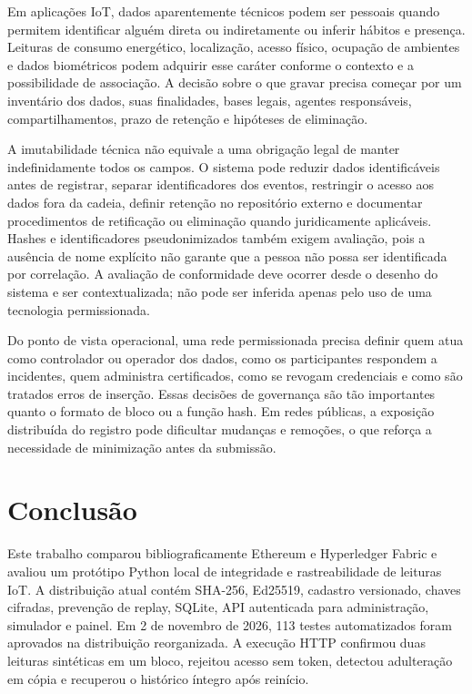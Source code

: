 \documentclass[10pt,a4paper,twocolumn]{article}
\begin{document}
Em aplicações IoT, dados aparentemente técnicos podem ser pessoais quando permitem identificar alguém direta ou indiretamente ou inferir hábitos e presença. Leituras de consumo energético, localização, acesso físico, ocupação de ambientes e dados biométricos podem adquirir esse caráter conforme o contexto e a possibilidade de associação. A decisão sobre o que gravar precisa começar por um inventário dos dados, suas finalidades, bases legais, agentes responsáveis, compartilhamentos, prazo de retenção e hipóteses de eliminação.

A imutabilidade técnica não equivale a uma obrigação legal de manter indefinidamente todos os campos. O sistema pode reduzir dados identificáveis antes de registrar, separar identificadores dos eventos, restringir o acesso aos dados fora da cadeia, definir retenção no repositório externo e documentar procedimentos de retificação ou eliminação quando juridicamente aplicáveis. Hashes e identificadores pseudonimizados também exigem avaliação, pois a ausência de nome explícito não garante que a pessoa não possa ser identificada por correlação. A avaliação de conformidade deve ocorrer desde o desenho do sistema e ser contextualizada; não pode ser inferida apenas pelo uso de uma tecnologia permissionada.

Do ponto de vista operacional, uma rede permissionada precisa definir quem atua como controlador ou operador dos dados, como os participantes respondem a incidentes, quem administra certificados, como se revogam credenciais e como são tratados erros de inserção. Essas decisões de governança são tão importantes quanto o formato de bloco ou a função hash. Em redes públicas, a exposição distribuída do registro pode dificultar mudanças e remoções, o que reforça a necessidade de minimização antes da submissão.

\section{Conclusão}
Este trabalho comparou bibliograficamente Ethereum e Hyperledger Fabric e avaliou um protótipo Python local de integridade e rastreabilidade de leituras IoT. A distribuição atual contém SHA-256, Ed25519, cadastro versionado, chaves cifradas, prevenção de replay, SQLite, API autenticada para administração, simulador e painel. Em 2 de novembro de 2026, 113 testes automatizados foram aprovados na distribuição reorganizada. A execução HTTP confirmou duas leituras sintéticas em um bloco, rejeitou acesso sem token, detectou adulteração em cópia e recuperou o histórico íntegro após reinício.
\end{document}
